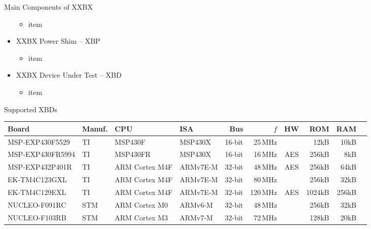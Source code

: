 \documentclass[xcolor=pdftex,dvipsnames,table,final]{beamer}
\begin{document}
\begin{frame}[fragile]{}
\begin{columns}[t]
\begin{column}{.31\linewidth}
\begin{block}{Main Components of XXBX}
\begin{itemize}
          \begin{itemize}
            \item item 
          \end{itemize}
          \item XXBX Power Shim -- XBP
          \begin{itemize}
            \item item 
          \end{itemize}
          \item XXBX Device Under Test -- XBD
          \begin{itemize}
            \item item 
          \end{itemize}
        \end{itemize}
      \end{block}
     
      \begin{block}{Supported XBDs}
    \begin{tabular}{l|l|ll|rrc|rr|r}
    Board            & Manuf.    & CPU            &  ISA        & Bus    &$f$       &HW   & ROM & RAM \\ \hline
    MSP-EXP430F5529  & TI        & MSP430F        &  MSP430X    & 16-bit &  25\,MHz &     &   12kB &  10kB  \\
    MSP-EXP430FR5994 & TI        & MSP430FR       &  MSP430X    & 16-bit &  16\,MHz & AES &  256kB &   8kB  \\
    MSP-EXP432P401R  & TI        & ARM Cortex M4F &  ARMv7E-M   & 32-bit &  48\,MHz & AES &  256kB &  64kB  \\
    EK-TM4C123GXL    & TI        & ARM Cortex M4F &  ARMv7E-M   & 32-bit &  80\,MHz &     &  256kB &  32kB  \\ 
    EK-TM4C129EXL    & TI        & ARM Cortex M4F &  ARMv7E-M   & 32-bit & 120\,MHz & AES & 1024kB & 256kB  \\ 
    NUCLEO-F091RC    & STM       & ARM Cortex M0  &  ARMv6-M    & 32-bit &  48\,MHz &     &  256kB &  32kB  \\
    NUCLEO-F103RB    & STM       & ARM Cortex M3  &  ARMv7-M    & 32-bit &  72\,MHz &     &  128kB &  20kB  \\
    \end{tabular}



\end{block}
\end{column}
\end{columns}
\end{frame}
\end{document}
